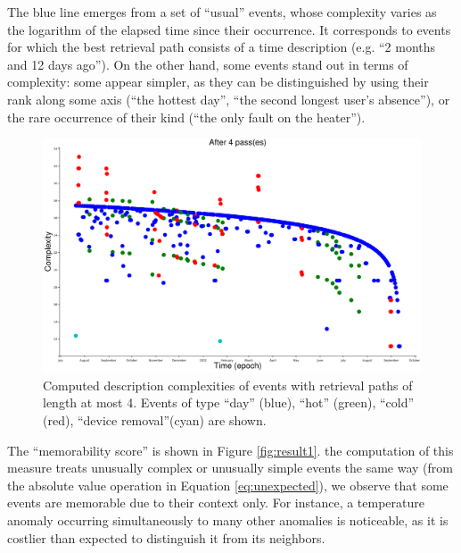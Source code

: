 \documentclass[entropy,article,submit,moreauthors,pdftex]{Definitions/mdpi}
\begin{document}
The blue line emerges from a set of ``usual'' events, whose complexity varies as the logarithm of
the elapsed time since their occurrence. It corresponds to events
for which the best retrieval path consists of a time description (e.g. ``2
months and 12 days ago''). On the other hand, some events stand out in terms of
complexity: some appear simpler, as they can be distinguished by using their
rank along some axis (``the hottest day'', ``the second longest user's
absence''), or the rare occurrence of their kind (``the only fault on the heater'').

\begin{figure}[ht]
    \centering
    \includegraphics[width=\linewidth]{figures/complexities_computed}
    \caption{Computed description complexities of events with retrieval paths of
        length at most 4. Events of type ``day'' (blue), ``hot'' (green), ``cold''
        (red), ``device removal''(cyan) are shown.}
    \label{fig:computed_cplx}
\end{figure}

The ``memorability score'' is shown in Figure \ref{fig:result1}.
the computation of this measure treats unusually complex or unusually simple events the
same way (from the absolute value operation in Equation \ref{eq:unexpected}), we
observe that some events are memorable due to their context only. For instance,
a temperature anomaly occurring simultaneously to many other anomalies is
noticeable, as it is costlier than expected to distinguish it from its neighbors.
\end{document}
